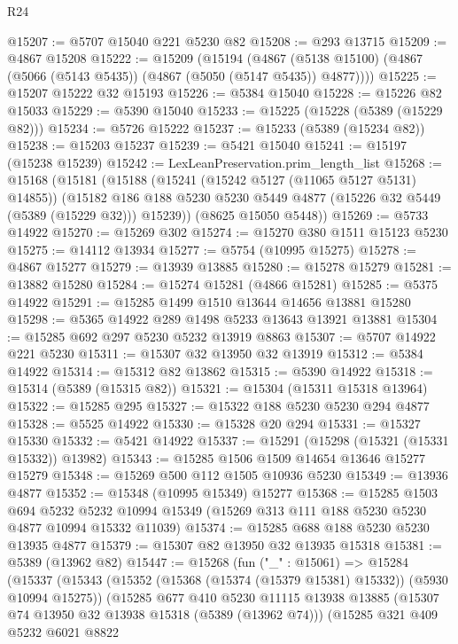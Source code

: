 \begin{lexlean}{R24}
\begin{coremodule}
@15207 := @5707 @15040 @221 @5230 @82
@15208 := @293 @13715
@15209 := @4867 @15208
@15222 := @15209
    (@15194
      (@4867 (@5138 @15100) (@4867 (@5066 (@5143 @5435)) (@4867 (@5050 (@5147 @5435)) @4877))))
@15225 := @15207 @15222 @32 @15193
@15226 := @5384 @15040
@15228 := @15226 @82 @15033
@15229 := @5390 @15040
@15233 := @15225 (@15228 (@5389 (@15229 @82)))
@15234 := @5726 @15222
@15237 := @15233 (@5389 (@15234 @82))
@15238 := @15203 @15237
@15239 := @5421 @15040
@15241 := @15197 (@15238 @15239)
@15242 := LexLeanPreservation.prim_length_list
@15268 := @15168
    (@15181
      (@15188
        (@15241 (@15242 @5127 (@11065 @5127 @5131) @14855))
        (@15182 @186 @188 @5230 @5230 @5449 @4877 (@15226 @32 @5449 (@5389 (@15229 @32))) @15239))
      (@8625 @15050 @5448))
@15269 := @5733 @14922
@15270 := @15269 @302
@15274 := @15270 @380 @1511 @15123 @5230
@15275 := @14112 @13934
@15277 := @5754 (@10995 @15275)
@15278 := @4867 @15277
@15279 := @13939 @13885
@15280 := @15278 @15279
@15281 := @13882 @15280
@15284 := @15274 @15281 (@4866 @15281)
@15285 := @5375 @14922
@15291 := @15285 @1499 @1510 @13644 @14656 @13881 @15280
@15298 := @5365 @14922 @289 @1498 @5233 @13643 @13921 @13881
@15304 := @15285 @692 @297 @5230 @5232 @13919 @8863
@15307 := @5707 @14922 @221 @5230
@15311 := @15307 @32 @13950 @32 @13919
@15312 := @5384 @14922
@15314 := @15312 @82 @13862
@15315 := @5390 @14922
@15318 := @15314 (@5389 (@15315 @82))
@15321 := @15304 (@15311 @15318 @13964)
@15322 := @15285 @295
@15327 := @15322 @188 @5230 @5230 @294 @4877
@15328 := @5525 @14922
@15330 := @15328 @20 @294
@15331 := @15327 @15330
@15332 := @5421 @14922
@15337 := @15291 (@15298 (@15321 (@15331 @15332)) @13982)
@15343 := @15285 @1506 @1509 @14654 @13646 @15277 @15279
@15348 := @15269 @500 @112 @1505 @10936 @5230
@15349 := @13936 @4877
@15352 := @15348 (@10995 @15349) @15277
@15368 := @15285
    @1503
    @694
    @5232
    @5232
    @10994
    @15349
    (@15269 @313 @111 @188 @5230 @5230 @4877 @10994 @15332 @11039)
@15374 := @15285 @688 @188 @5230 @5230 @13935 @4877
@15379 := @15307 @82 @13950 @32 @13935 @15318
@15381 := @5389 (@13962 @82)
@15447 := @15268
    (fun ("_" : @15061) =>
    @15284
      (@15337
        (@15343
          (@15352 (@15368 (@15374 (@15379 @15381) @15332)) (@5930 @10994 @15275))
          (@15285
            @677
            @410
            @5230
            @11115
            @13938
            @13885
            (@15307 @74 @13950 @32 @13938 @15318 (@5389 (@13962 @74)))
            (@15285
              @321
              @409
              @5232
              @6021
              @8822

\end{coremodule}
\end{lexlean}
